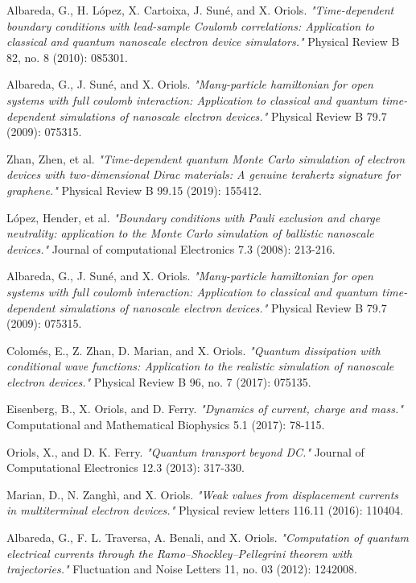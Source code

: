 \documentclass[11pt, a4paper]{article} %
\begin{document}
\begin{thebibliography}{1}
{
Albareda, G., H. López, X. Cartoixa, J. Suné, and X. Oriols. {\em "Time-dependent boundary conditions with lead-sample Coulomb correlations: Application to classical and quantum nanoscale electron device simulators."} Physical Review B 82, no. 8 (2010): 085301.

Albareda, G., J. Suné, and X. Oriols. {\em "Many-particle hamiltonian for open systems with full coulomb interaction: Application to classical and quantum time-dependent simulations of nanoscale electron devices."} Physical Review B 79.7 (2009): 075315.

Zhan, Zhen, et al. {\em "Time-dependent quantum Monte Carlo simulation of electron devices with two-dimensional Dirac materials: A genuine terahertz signature for graphene."} Physical Review B 99.15 (2019): 155412.

López, Hender, et al. {\em "Boundary conditions with Pauli exclusion and charge neutrality: application to the Monte Carlo simulation of ballistic nanoscale devices."} Journal of computational Electronics 7.3 (2008): 213-216.

Albareda, G., J. Suné, and X. Oriols. {\em "Many-particle hamiltonian for open systems with full coulomb interaction: Application to classical and quantum time-dependent simulations of nanoscale electron devices."} Physical Review B 79.7 (2009): 075315.

Colomés, E., Z. Zhan, D. Marian, and X. Oriols. {\em "Quantum dissipation with conditional wave functions: Application to the realistic simulation of nanoscale electron devices."} Physical Review B 96, no. 7 (2017): 075135.

Eisenberg, B., X. Oriols, and D. Ferry. {\em "Dynamics of current, charge and mass."} Computational and Mathematical Biophysics 5.1 (2017): 78-115.

Oriols, X., and D. K. Ferry. {\em "Quantum transport beyond DC."} Journal of Computational Electronics 12.3 (2013): 317-330.

Marian, D., N. Zanghì, and X. Oriols. {\em "Weak values from displacement currents in multiterminal electron devices."} Physical review letters 116.11 (2016): 110404.

Albareda, G., F. L. Traversa, A. Benali, and X. Oriols. {\em "Computation of quantum electrical currents through the Ramo–Shockley–Pellegrini theorem with trajectories."} Fluctuation and Noise Letters 11, no. 03 (2012): 1242008.

}
\end{thebibliography}
\end{document}

